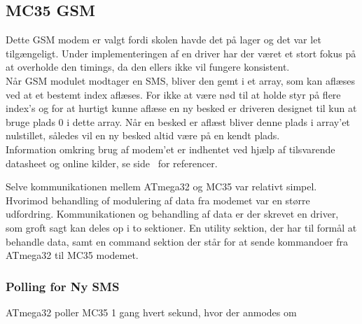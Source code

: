 \subsection{MC35 GSM}

Dette GSM modem er valgt fordi skolen havde det på lager og det var let tilgængeligt.
Under implementeringen af en driver har der været et stort fokus på at overholde den timings, da den ellers ikke vil fungere konsistent.\\

Når GSM modulet modtager en SMS, bliver den gemt i et array, som kan aflæses ved at et bestemt index aflæses. For ikke at være nød til at holde styr 
på flere index's og for at hurtigt kunne aflæse en ny besked er driveren designet til kun at bruge plads 0 i dette array. 
Når en besked er aflæst bliver denne plads i array'et nulstillet, således vil en ny besked altid være på en kendt plads.\\

Information omkring brug af modem'et er indhentet ved hjælp af tilsvarende datasheet og online kilder, se side~\pageref{sec:refs} for referencer.

Selve kommunikationen mellem ATmega32 og MC35 var relativt simpel. Hvorimod behandling of modulering af data fra modemet var en større udfordring.
Kommunikationen og behandling af data er der skrevet en driver, som groft sagt kan deles op i to sektioner. En utility sektion, der har til formål at 
behandle data, samt en command sektion der står for at sende kommandoer fra ATmega32 til MC35 modemet. 

\subsubsection{Polling for Ny SMS}

ATmega32 poller MC35 1 gang hvert sekund, hvor der anmodes om 



